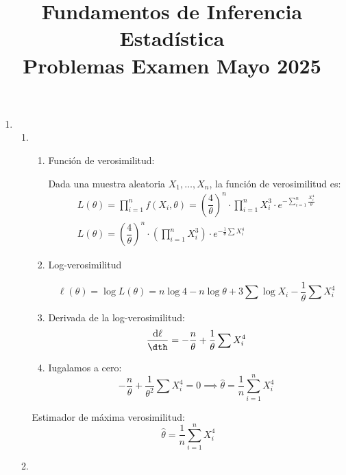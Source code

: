 
\title{Fundamentos de Inferencia Estadística\\Problemas Examen Mayo 2025}


\maketitle
\begin{enumerate}[label=\color{red}\textbf{\arabic*)}]
    \item {}
    \begin{enumerate}[label=\color{red}\textbf{\alph*)}]
        \item {} 

            \begin{enumerate}[label=\arabic*)]
                \item Función de verosimilitud:

                    Dada una muestra aleatoria $X_1,\dots,X_n$, la función de verosimilitud es: \[
                    \begin{array}{c}
                        L(\theta)=\prod_{i=1}^{n} f(X_i,\theta)=\left( \dfrac{4}{\theta} \right) ^n\cdot \prod_{i=1}^{n} X_i^3\cdot e^{-\sum_{i=1}^{n} \frac{X_i^4}{\theta} } \\
                        L(\theta)=\left( \dfrac{4}{\theta} \right) ^n \cdot \left( \prod_{i=1}^{n} X_i^3  \right) \cdot e^{-\frac{1}{\theta} \sum X_i^4} 
                    \end{array}
                    \] 
                \item Log-verosimilitud

                    \[
                    \ell(\theta)=\log L(\theta)=n\log 4-n\log\theta+3\sum \log X_i-\dfrac{1}{\theta}\sum X_i^4
                    \] 
                \item Derivada de la log-verosimilitud: \[
                \dfrac{\mathrm{d}\ell}{\dth }=-\dfrac{n}{\theta}+\dfrac{1}{\theta}\sum X_i^4
                \] 
                \item Iugalamos a cero:
                    \[
                    -\dfrac{n}{\theta}+\dfrac{1}{\theta^2}\sum X_i^4=0\implies \hat{\theta}=\dfrac{1}{n}\sum_{i=1}^{n} X_i^4
                    \] 
            \end{enumerate}
            Estimador de máxima verosimilitud: \[
            \hat{\theta}=\dfrac{1}{n}\sum_{i=1}^{n} X_i^4
            \] 
        \item {} 


\end{enumerate}
\end{enumerate}
